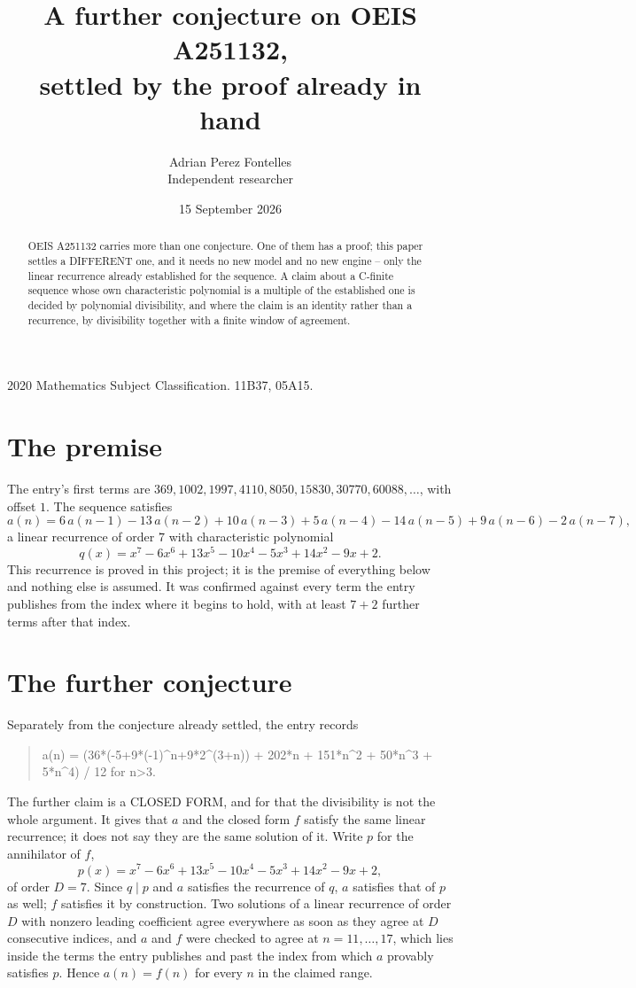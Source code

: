 \documentclass[11pt,a4paper]{article}
\title{A further conjecture on OEIS A251132,\\ \large settled by the proof already in hand}
\author{Adrian Perez Fontelles\\ \small Independent researcher}
\date{15 September 2026}
\theoremstyle{plain}
\theoremstyle{definition}
\begin{document}
\maketitle

\begin{abstract}
OEIS A251132 carries more than one conjecture. One of them has a proof; this paper settles a
DIFFERENT one, and it needs no new model and no new engine -- only the linear recurrence already
established for the sequence. A claim about a C-finite sequence whose own characteristic
polynomial is a multiple of the established one is decided by polynomial divisibility, and where
the claim is an identity rather than a recurrence, by divisibility together with a finite window
of agreement.
\end{abstract}

\noindent\small 2020 Mathematics Subject Classification. 11B37, 05A15.\normalsize

\section{The premise}

The entry's first terms are $369, 1002, 1997, 4110, 8050, 15830, 30770, 60088,\dots$, with offset $1$. The sequence satisfies
\[
  a(n)=6\,a(n-1) - 13\,a(n-2) + 10\,a(n-3) + 5\,a(n-4) - 14\,a(n-5) + 9\,a(n-6) - 2\,a(n-7) ,
\]
a linear recurrence of order $7$ with characteristic polynomial
\[
  q(x)=x^{7} - 6 x^{6} + 13 x^{5} - 10 x^{4} - 5 x^{3} + 14 x^{2} - 9 x + 2 .
\]
This recurrence is proved in this project; it is the premise of everything below and nothing else is assumed.
It was confirmed against every term the entry publishes from the index where it begins to hold,
with at least $7+2$ further terms after that index.

\section{The further conjecture}

Separately from the conjecture already settled, the entry records

\begin{quote}\raggedright a(n) = (36*(-5+9*(-1)\^{}n+9*2\^{}(3+n)) + 202*n + 151*n\^{}2 + 50*n\^{}3 + 5*n\^{}4) / 12 for n>3.\end{quote}

The further claim is a CLOSED FORM, and for that the divisibility is not the whole argument. It
gives that $a$ and the closed form $f$ satisfy the same linear recurrence; it does not say they
are the same solution of it. Write $p$ for the annihilator of $f$,
\[
  p(x)=x^{7} - 6 x^{6} + 13 x^{5} - 10 x^{4} - 5 x^{3} + 14 x^{2} - 9 x + 2 ,
\]
of order $D=7$. Since $q\mid p$ and $a$ satisfies the recurrence of $q$, $a$ satisfies that of
$p$ as well; $f$ satisfies it by construction. Two solutions of a linear recurrence of order $D$
with nonzero leading coefficient agree everywhere as soon as they agree at $D$ consecutive
indices, and $a$ and $f$ were checked to agree at $n=11,\dots,17$,
which lies inside the terms the entry publishes and past the index from which $a$ provably
satisfies $p$. Hence $a(n)=f(n)$ for every $n$ in the claimed range.
\end{document}
